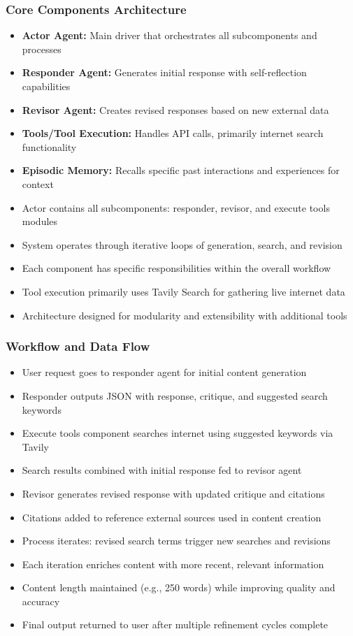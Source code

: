 \begin{frame}[fragile]\frametitle{Core Components Architecture}
      \begin{itemize}
          \item \textbf{Actor Agent:} Main driver that orchestrates all subcomponents and processes
          \item \textbf{Responder Agent:} Generates initial response with self-reflection capabilities
          \item \textbf{Revisor Agent:} Creates revised responses based on new external data
          \item \textbf{Tools/Tool Execution:} Handles API calls, primarily internet search functionality
          \item \textbf{Episodic Memory:} Recalls specific past interactions and experiences for context
          \item Actor contains all subcomponents: responder, revisor, and execute tools modules
          \item System operates through iterative loops of generation, search, and revision
          \item Each component has specific responsibilities within the overall workflow
          \item Tool execution primarily uses Tavily Search for gathering live internet data
          \item Architecture designed for modularity and extensibility with additional tools
      \end{itemize}
\end{frame}
\begin{frame}[fragile]\frametitle{Workflow and Data Flow}
      \begin{itemize}
          \item User request goes to responder agent for initial content generation
          \item Responder outputs JSON with response, critique, and suggested search keywords
          \item Execute tools component searches internet using suggested keywords via Tavily
          \item Search results combined with initial response fed to revisor agent
          \item Revisor generates revised response with updated critique and citations
          \item Citations added to reference external sources used in content creation
          \item Process iterates: revised search terms trigger new searches and revisions
          \item Each iteration enriches content with more recent, relevant information
          \item Content length maintained (e.g., 250 words) while improving quality and accuracy
          \item Final output returned to user after multiple refinement cycles complete
      \end{itemize}
\end{frame}
